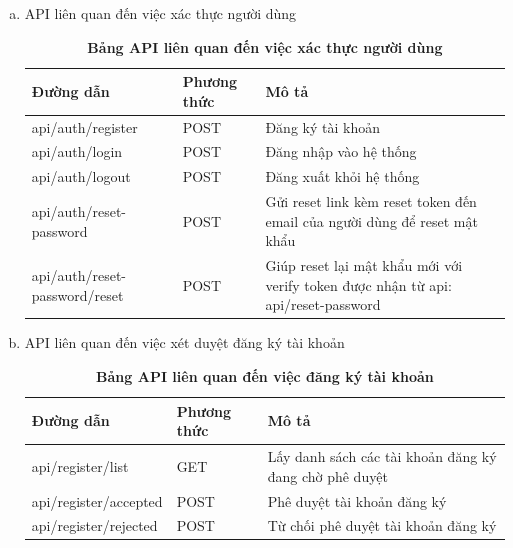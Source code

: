 \begin{enumerate}[a)]
  \item API liên quan đến việc xác thực người dùng


\begin{table}[H]
  \centering
  \caption{\bfseries \fontsize{12pt}{0pt}\selectfont Bảng API liên quan đến việc xác thực người dùng}
  \begin{tabularx}{0.9\textwidth}{
  | >{\raggedright\arraybackslash}X
  | >{\raggedright\arraybackslash}m{2cm}
  | >{\raggedright\arraybackslash}X|
  }
  \hline
  \bfseries Đường dẫn    &\bfseries Phương thức    &\bfseries Mô tả\\ \hline
  api/auth/register   &   POST  & Đăng ký tài khoản \\ \hline
  api/auth/login   &    POST    & Đăng nhập vào hệ thống \\ \hline
  api/auth/logout   &    POST    & Đăng xuất khỏi hệ thống \\ \hline
  api/auth/reset-password  &     POST   &  Gửi reset link kèm reset token đến email của người dùng để reset mật khẩu \\  \hline
  api/auth/reset-password/reset &   POST     & Giúp reset lại mật khẩu mới với verify token được nhận từ api: api/reset-password  \\ \hline

  \end{tabularx}
  \label{table_api_auth}
\end{table}

  \item API liên quan đến việc xét duyệt đăng ký tài khoản


\begin{table}[H]
  \centering
  \caption{\bfseries \fontsize{12pt}{0pt}\selectfont Bảng API liên quan đến việc đăng ký tài khoản}
  \begin{tabularx}{0.9\textwidth}{
  | >{\raggedright\arraybackslash}X
  | >{\raggedright\arraybackslash}m{2cm}
  | >{\raggedright\arraybackslash}X|
  }
  \hline
  \bfseries Đường dẫn    &\bfseries Phương thức    &\bfseries Mô tả\\ \hline
  api/register/list   &   GET  & Lấy danh sách các tài khoản đăng ký đang chờ phê duyệt \\ \hline
  api/register/accepted   &    POST    & Phê duyệt tài khoản đăng ký \\ \hline
  api/register/rejected  &     POST   &  Từ chối phê duyệt tài khoản đăng ký \\  \hline


\end{tabularx}
\end{table}
\end{enumerate}
